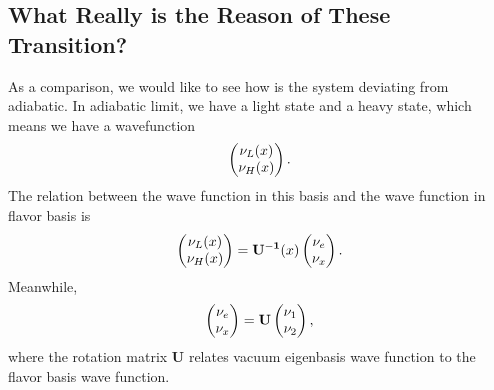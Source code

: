 \documentclass[letterpaper,12pt,english]{sphinxmanual}
\begin{document}
\subsection{What Really is the Reason of These Transition?}
\label{matter-driven:what-really-is-the-reason-of-these-transition}
As a comparison, we would like to see how is the system deviating from adiabatic. In adiabatic limit, we have a light state and a heavy state, which means we have a wavefunction
\begin{gather}
\begin{split}\begin{pmatrix} \nu_L(x) \\ \nu_H(x) \end{pmatrix}.\end{split}\notag
\end{gather}
The relation between the wave function in this basis and the wave function in flavor basis is
\begin{gather}
\begin{split}\begin{pmatrix} \nu_L(x) \\ \nu_H(x) \end{pmatrix} = \mathbf{U^{-1}}(x) \begin{pmatrix} \nu_e \\ \nu_x \end{pmatrix}.\end{split}\notag
\end{gather}
Meanwhile,
\begin{gather}
\begin{split}\begin{pmatrix} \nu_e \\ \nu_x \end{pmatrix} = \mathbf{U} \begin{pmatrix} \nu_1 \\ \nu_2 \end{pmatrix},\end{split}\notag
\end{gather}
where the rotation matrix \(\mathbf{U}\) relates vacuum eigenbasis wave function to the flavor basis wave function.
\end{document}

